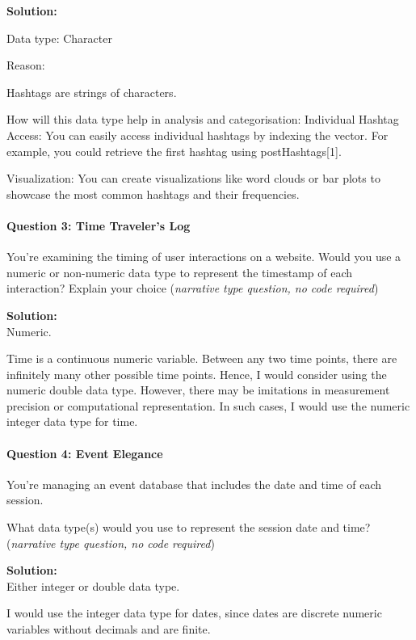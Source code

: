\documentclass[
]{article}
\begin{document}
\textbf{Solution:}

Data type: Character

Reason:

Hashtags are strings of characters.

How will this data type help in analysis and categorisation: Individual
Hashtag Access: You can easily access individual hashtags by indexing
the vector. For example, you could retrieve the first hashtag using
postHashtags{[}1{]}.

Visualization: You can create visualizations like word clouds or bar
plots to showcase the most common hashtags and their frequencies.

\hypertarget{question-3-time-travelers-log}{%
\paragraph{Question 3: Time Traveler's
Log}\label{question-3-time-travelers-log}}

You're examining the timing of user interactions on a website. Would you
use a numeric or non-numeric data type to represent the timestamp of
each interaction? Explain your choice (\emph{narrative type question, no
code required})

\textbf{Solution:}\\
Numeric.

Time is a continuous numeric variable. Between any two time points,
there are infinitely many other possible time points. Hence, I would
consider using the numeric double data type. However, there may be
imitations in measurement precision or computational representation. In
such cases, I would use the numeric integer data type for time.

\hypertarget{question-4-event-elegance}{%
\paragraph{Question 4: Event Elegance}\label{question-4-event-elegance}}

You're managing an event database that includes the date and time of
each session.

What data type(s) would you use to represent the session date and time?
(\emph{narrative type question, no code required})

\textbf{Solution:}\\
Either integer or double data type.

I would use the integer data type for dates, since dates are discrete
numeric variables without decimals and are finite.
\end{document}
